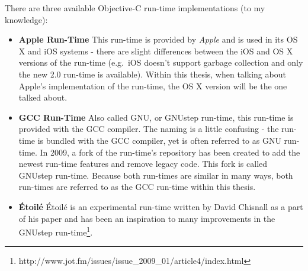 There are three available Objective-C run-time implementations (to my knowledge):

\begin{itemize}
  \item{\bf{Apple Run-Time}} This run-time is provided by \emph{Apple} and is used in its OS X and iOS systems - there are slight differences between the iOS and OS X versions of the run-time (e.g.\ iOS doesn't support garbage collection and only the new 2.0 run-time is available). Within this thesis, when talking about Apple's implementation of the run-time, the OS X version will be the one talked about.
  \item{\bf{GCC Run-Time}} Also called GNU, or GNUstep run-time, this run-time is provided with the GCC compiler. The naming is a little confusing - the run-time is bundled with the GCC compiler, yet is often referred to as GNU run-time. In 2009, a fork of the run-time's repository has been created to add the newest run-time features and remove legacy code. This fork is called GNUstep run-time. Because both run-times are similar in many ways, both run-times are referred to as the GCC run-time within this thesis.
  \item{\bf{\'{E}toil\'{e}}} \'{E}toil\'{e} is an experimental run-time written by David Chisnall as a part of his paper and has been an inspiration to many improvements in the GNUstep run-time\footnote{http://www.jot.fm/issues/issue\_2009\_01/article4/index.html}.
\end{itemize}

